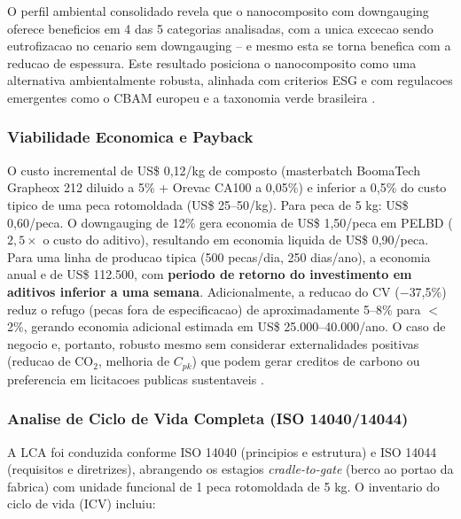 \documentclass[11pt,a4paper,oneside]{article}
\begin{document}
O perfil ambiental consolidado revela que o nanocomposito com downgauging oferece beneficios em 4 das 5 categorias analisadas, com a unica excecao sendo eutrofizacao no cenario sem downgauging -- e mesmo esta se torna benefica com a reducao de espessura. Este resultado posiciona o nanocomposito como uma alternativa ambientalmente robusta, alinhada com criterios ESG e com regulacoes emergentes como o CBAM europeu e a taxonomia verde brasileira \cite{Araby2020}.

\subsubsection{Viabilidade Economica e Payback}

O custo incremental de US\$ 0,12/kg de composto (masterbatch BoomaTech Grapheox 212 diluido a 5\% + Orevac CA100 a 0,05\%) e inferior a 0,5\% do custo tipico de uma peca rotomoldada (US\$ 25--50/kg). Para peca de 5 kg: US\$ 0,60/peca. O downgauging de 12\% gera economia de US\$ 1,50/peca em PELBD ($2{,}5{\times}$ o custo do aditivo), resultando em economia liquida de US\$ 0,90/peca. Para uma linha de producao tipica (500 pecas/dia, 250 dias/ano), a economia anual e de US\$ 112.500, com {\bfseries periodo de retorno do investimento em aditivos inferior a uma semana}. Adicionalmente, a reducao do CV ($-$37,5\%) reduz o refugo (pecas fora de especificacao) de aproximadamente 5--8\% para $<$2\%, gerando economia adicional estimada em US\$ 25.000--40.000/ano. O caso de negocio e, portanto, robusto mesmo sem considerar externalidades positivas (reducao de CO$_2$, melhoria de $C_{pk}$) que podem gerar creditos de carbono ou preferencia em licitacoes publicas sustentaveis \cite{Montgomery2020}.

\subsubsection{Analise de Ciclo de Vida Completa (ISO 14040/14044)}

A LCA foi conduzida conforme ISO 14040 (principios e estrutura) e ISO 14044 (requisitos e diretrizes), abrangendo os estagios \textit{cradle-to-gate} (berco ao portao da fabrica) com unidade funcional de 1 peca rotomoldada de 5 kg. O inventario do ciclo de vida (ICV) incluiu:
\end{document}
